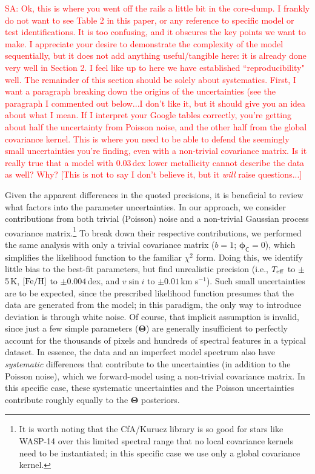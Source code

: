 \documentclass[iop,floatfix]{emulateapj}
\newcommand{\vT}{ {\bm \Theta}}
\newcommand{\vp}{ {\bm \phi}}
\newcommand{\cov}{ \vp_{\mathsf{C}}}
\newcommand{\comm}[1]{ \textcolor{red}{SA: #1}}
\begin{document}
\comm{Ok, this is where you went off the rails a little bit in the core-dump.  I frankly do not 
want to see Table 2 in this paper, or any reference to specific model or test identifications.  It 
is too confusing, and it obscures the key points we want to make.  I appreciate your desire to 
demonstrate the complexity of the model sequentially, but it does not add anything useful/tangible 
here: it is already done very well in Section 2.  I feel like up to here we have 
established ``reproducibility" well.  The remainder of this section should be solely about 
systematics.  First, I want a paragraph breaking down the origins of the uncertainties (see the 
paragraph I commented out below...I don't like it, but it should give you an idea about what I 
mean.  If I interpret your Google tables correctly, you're getting about half the uncertainty from 
Poisson noise, and the other half from the global covariance kernel.  This is where you need to be 
able to defend the seemingly small uncertainties you're finding, even with a non-trivial covariance 
matrix.  Is it really true that a model with 0.03\,dex lower metallicity cannot describe the data 
as well?  Why?  [This is not to say I don't believe it, but it {\it will} raise questions...]}

Given the apparent differences in the quoted precisions, it is beneficial to review what factors 
into the parameter uncertainties.  In our approach, we consider contributions from both trivial 
(Poisson) noise and a non-trivial Gaussian process covariance matrix.\footnote{It is worth noting 
that the {\sc CfA/Kurucz} library is so good for stars like WASP-14 over this limited spectral 
range that no local covariance kernels need to be instantiated; in this specific case we use only a 
global covariance kernel.}  To break down their respective contributions, we performed the 
same analysis with only a trivial covariance matrix ($b = 1$; $\cov = 0$), which simplifies the 
likelihood function to the familiar $\chi^2$ form.  Doing this, we identify little bias to the 
best-fit parameters, but find unrealistic precision (i.e., $T_{\rm eff}$ to $\pm$5\,K, 
$[{\rm Fe/H}]$ to $\pm0.004$\,dex, and $v \sin i$ to $\pm0.01$\,km s$^{-1}$).  Such small 
uncertainties are to be expected, since the prescribed likelihood function presumes that the data 
are generated from the model; in this paradigm, the only way to introduce deviation is through 
white noise.  Of course, that implicit assumption is invalid, since just a few simple parameters 
($\vT$) are generally insufficient to perfectly account for the thousands of pixels and hundreds of 
spectral features in a typical dataset.  In essence, the data and an imperfect model spectrum also 
have {\it systematic} differences that contribute to the uncertainties (in addition to the Poisson 
noise), which we forward-model using a non-trivial covariance matrix.  In this specific case, these 
systematic uncertainties and the Poisson uncertainties contribute roughly equally to the $\vT$
posteriors.  
\end{document}
